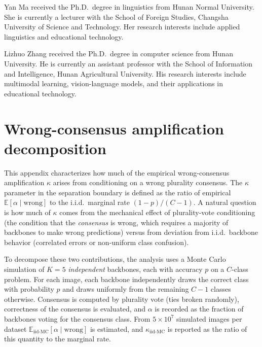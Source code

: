 \documentclass[a4paper,fleqn]{cas-sc}
\begin{document}
\printcredits

\bio{}
Yan Ma received the Ph.D.\ degree in linguistics from Hunan Normal University. She is currently a lecturer with the School of Foreign Studies, Changsha University of Science and Technology. Her research interests include applied linguistics and educational technology.
\endbio

\bio{}
Lizhuo Zhang received the Ph.D.\ degree in computer science from Hunan University. He is currently an assistant professor with the School of Information and Intelligence, Hunan Agricultural University. His research interests include multimodal learning, vision-language models, and their applications in educational technology.
\endbio





\clearpage
\appendix
\section{Wrong-consensus amplification decomposition}
\label{sec:kappa_decomp}

This appendix characterizes how much of the empirical wrong-consensus amplification $\kappa$ arises from conditioning on a wrong plurality consensus.
The $\kappa$ parameter in the separation boundary is defined as the ratio of empirical $\mathbb{E}[\alpha\mid\text{wrong}]$ to the i.i.d.\ marginal rate $(1-p)/(C-1)$.
A natural question is how much of $\kappa$ comes from the mechanical effect of plurality-vote conditioning (the condition that the \emph{consensus} is wrong, which requires a majority of backbones to make wrong predictions) versus from deviation from i.i.d.\ backbone behavior (correlated errors or non-uniform class confusion).

To decompose these two contributions, the analysis uses a Monte Carlo simulation of $K{=}5$ \emph{independent} backbones, each with accuracy $p$ on a $C$-class problem.
For each image, each backbone independently draws the correct class with probability $p$ and draws uniformly from the remaining $C{-}1$ classes otherwise.
Consensus is computed by plurality vote (ties broken randomly), correctness of the consensus is evaluated, and $\alpha$ is recorded as the fraction of backbones voting for the consensus class.
From $5\times 10^7$ simulated images per dataset $\mathbb{E}_{\text{iid-MC}}[\alpha\mid\text{wrong}]$ is estimated, and $\kappa_{\text{iid-MC}}$ is reported as the ratio of this quantity to the marginal rate.
\end{document}
